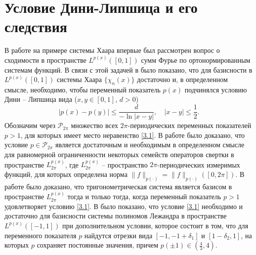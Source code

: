 \section{Условие Дини-Липшица и его следствия}
В работе \cite{ShIIBJWShar1} на примере системы Хаара впервые был рассмотрен вопрос о сходимости в пространстве $L^{p(x)}([0,1])$   сумм Фурье по ортонормированным системам функций. В связи с этой задачей в \cite{ShIIBJWShar1} было показано, что для базисности в $L^{p(x)}([0,1])$ системы Хаара $\{\chi_n(x)\}$ достаточно и, в определенном смысле, необходимо, чтобы переменный показатель $p(x)$ подчинялся условию Дини -- Липшица вида ($x,y\in[0,1]$, $d>0$)
\begin{equation}\label{3.1}
|p(x)-p(y)|\le \frac{d}{-\ln|x-y|}, \quad |x-y|\le\frac12.
\end{equation}
Обозначим через $\mathcal{P}_{2\pi}$ множество всех  $2\pi$-периодических переменных показателей  $p>1$, для которых имеет место неравенство \eqref{3.1}.  В работе \cite{ShIIBJWShar5} было доказано, что условие $p\in\mathcal{P}_{2\pi}$  является достаточным и необходимым в определенном смысле для равномерной ограниченности некоторых семейств операторов свертки в пространстве $L^{p(x)}_{2\pi}$, где $L^{p(x)}_{2\pi}$ -- пространство $2\pi$-периодических измеримых функций, для которых определена норма $\|f\|_{p(\cdot)}=\|f\|_{p(\cdot)}([0,2\pi])$. В работе \cite{ShIIBJWShar2} было доказано, что тригонометрическая система является базисом в пространстве $L^{p(x)}_{2\pi}$ тогда и только тогда, когда переменный показатель $p>1$ удовлетворяет условию  \eqref{3.1}.
 В \cite{ShIIBJWSharap1} было показано, что условие \eqref{3.1} необходимо и достаточно для базисности системы полиномов Лежандра в пространстве $L^{p(x)}([-1,1])$ при дополнительном условии, которое состоит в том, что для  переменного показателя  $p$ найдутся отрезки вида $[-1,-1+\delta_1]$ и $[1-\delta_2,1]$, на  которых $p$ сохраняет постоянные значения, причем $p(\pm1)\in(\frac43,4)$.

